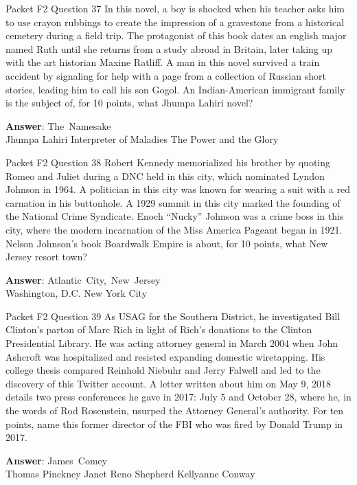 \begin{frame}{Packet F2 Question 37}
In this novel, a boy is shocked when his teacher asks him to use crayon rubbings to create the impression of a gravestone from a historical cemetery during a field trip. The protagonist of this book dates an english major named Ruth until she returns from a study abroad in Britain, later taking up with the art historian Maxine Ratliff. A man in this novel survived a train accident by signaling for help   with a page from a collection of Russian short stories, leading him to call his son Gogol. An Indian-American   immigrant family is the subject of, for 10 points, what Jhumpa Lahiri novel?    

\textbf{Answer}: The\ Namesake\\
 Jhumpa Lahiri
 Interpreter of Maladies
 The Power and the Glory
\end{frame}

\begin{frame}{Packet F2 Question 38}
Robert Kennedy memorialized his brother by quoting Romeo and Juliet during a DNC held in this city, which nominated Lyndon Johnson in 1964. A politician in this city was known for wearing a suit with a red carnation in his buttonhole. A 1929 summit in this city marked the founding of the National Crime Syndicate. Enoch “Nucky” Johnson was a crime boss in this city, where the modern incarnation of the Miss America Pageant began in 1921. Nelson Johnson’s book Boardwalk Empire is about, for 10 points, what New Jersey resort     town?    

\textbf{Answer}: Atlantic\ City,\ New\ Jersey\\
 Washington, D.C.
 New York City
\end{frame}

\begin{frame}{Packet F2 Question 39}
As USAG for the Southern District, he investigated   Bill Clinton's parton of Marc Rich in light of Rich's donations to the Clinton Presidential Library.  He was acting attorney general in March 2004 when John Ashcroft was hospitalized and resisted expanding domestic wiretapping.  His college thesis compared Reinhold Niebuhr and Jerry Falwell and led to the discovery of this Twitter account.  A letter written about him on May 9, 2018 details two press conferences he gave in 2017: July 5 and October 28, where he, in the words of Rod Rosenstein, usurped the Attorney General's authority.  For ten points, name this former director of the FBI who was fired by Donald Trump in 2017.      

\textbf{Answer}: James\ Comey\\
 Thomas Pinckney
 Janet Reno
 Shepherd
 Kellyanne Conway
\end{frame}

